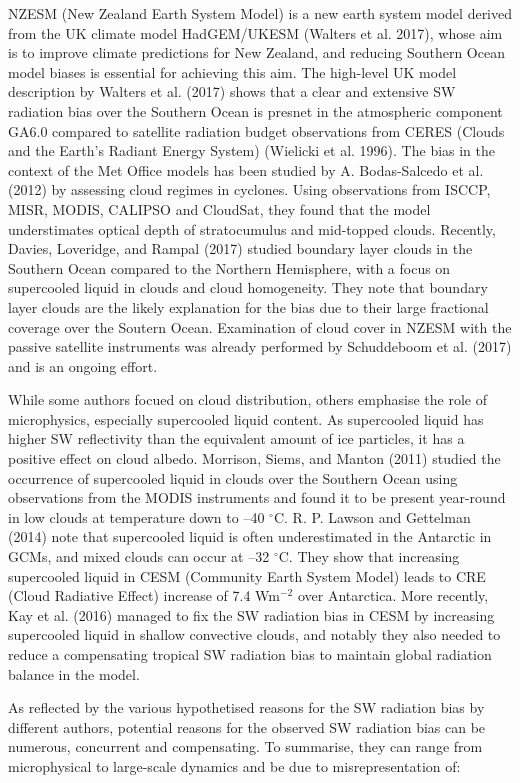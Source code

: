 NZESM (New Zealand Earth System Model) is a new earth system model
derived from the UK climate model HadGEM/UKESM (Walters et al. 2017),
whose aim is to improve climate predictions for New Zealand, and
reducing Southern Ocean model biases is essential for achieving this
aim. The high-level UK model description by Walters et al. (2017) shows
that a clear and extensive SW radiation bias over the Southern Ocean is
presnet in the atmospheric component GA6.0 compared to satellite
radiation budget observations from CERES (Clouds and the Earth's Radiant
Energy System) (Wielicki et al. 1996). The bias in the context of the
Met Office models has been studied by A. Bodas-Salcedo et al. (2012) by
assessing cloud regimes in cyclones. Using observations from ISCCP,
MISR, MODIS, CALIPSO and CloudSat, they found that the model
understimates optical depth of stratocumulus and mid-topped clouds.
Recently, Davies, Loveridge, and Rampal (2017) studied boundary layer
clouds in the Southern Ocean compared to the Northern Hemisphere, with a
focus on supercooled liquid in clouds and cloud homogeneity. They note
that boundary layer clouds are the likely explanation for the bias due
to their large fractional coverage over the Soutern Ocean. Examination
of cloud cover in NZESM with the passive satellite instruments was
already performed by Schuddeboom et al. (2017) and is an ongoing effort.

While some authors focued on cloud distribution, others emphasise the
role of microphysics, especially supercooled liquid content. As
supercooled liquid has higher SW reflectivity than the equivalent amount
of ice particles, it has a positive effect on cloud albedo. Morrison,
Siems, and Manton (2011) studied the occurrence of supercooled liquid in
clouds over the Southern Ocean using observations from the MODIS
instruments and found it to be present year-round in low clouds at
temperature down to --40 $^{\circ}$C. R. P. Lawson and Gettelman (2014)
note that supercooled liquid is often underestimated in the Antarctic in
GCMs, and mixed clouds can occur at --32 $^{\circ}$C. They show that
increasing supercooled liquid in CESM (Community Earth System Model)
leads to CRE (Cloud Radiative Effect) increase of 7.4 Wm$^{-2}$ over
Antarctica. More recently, Kay et al. (2016) managed to fix the SW
radiation bias in CESM by increasing supercooled liquid in shallow
convective clouds, and notably they also needed to reduce a compensating
tropical SW radiation bias to maintain global radiation balance in the
model.

As reflected by the various hypothetised reasons for the SW radiation
bias by different authors, potential reasons for the observed SW
radiation bias can be numerous, concurrent and compensating. To
summarise, they can range from microphysical to large-scale dynamics and
be due to misrepresentation of:

